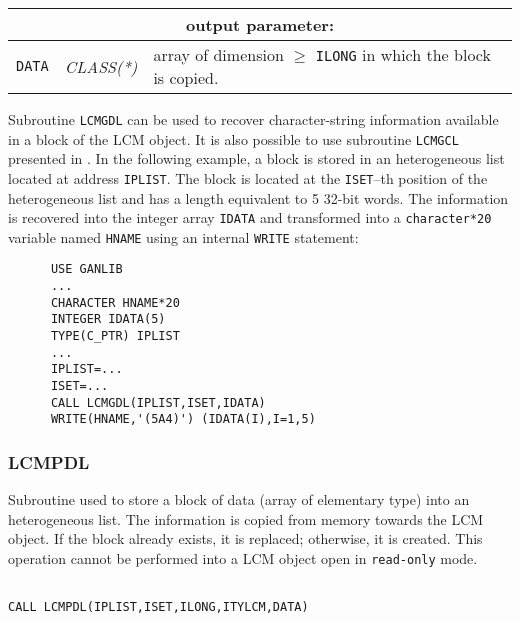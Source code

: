 \noindent
\begin{tabular}{|p{1.5cm}|p{3cm}|p{10cm}|}
\hline
\multicolumn{3}{|c|}{\bf output parameter:} \\
\hline
{\tt DATA} & {\it CLASS(*)} & array of dimension $\ge$ {\tt ILONG} in which the block is copied. \\
\hline
\end{tabular}

\vskip 0.4cm

Subroutine {\tt LCMGDL} can be used to recover character-string information available in a block
of the LCM object. It is also possible to use subroutine {\tt LCMGCL} presented in .
In the following example, a block is stored in an heterogeneous list located at
address {\tt IPLIST}. The block is located at the {\tt ISET}--th position of the heterogeneous list and has a length equivalent to 5 32-bit words.
The information is recovered into the integer array {\tt IDATA} and transformed into a {\tt character*20} variable named {\tt HNAME} using an internal {\tt WRITE} statement:

\begin{verbatim}
      USE GANLIB
      ...
      CHARACTER HNAME*20
      INTEGER IDATA(5)
      TYPE(C_PTR) IPLIST
      ...
      IPLIST=...
      ISET=...
      CALL LCMGDL(IPLIST,ISET,IDATA)
      WRITE(HNAME,'(5A4)') (IDATA(I),I=1,5)
\end{verbatim}

\subsubsection{LCMPDL}

Subroutine used to store a block of data (array of elementary type) into an heterogeneous list. 
The information is copied from memory towards the LCM object. If the block already exists, it is replaced;
otherwise, it is created. This operation cannot be performed into a LCM object open in {\tt read-only} mode.

\begin{verbatim}

CALL LCMPDL(IPLIST,ISET,ILONG,ITYLCM,DATA)
\end{verbatim}

\vskip 0.2cm

